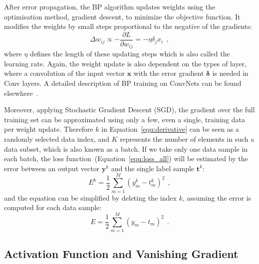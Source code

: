 After error propagation, the BP algorithm updates weights using the optimisation method, gradient descent, to minimize the objective function.
It modifies the weights by small steps proportional to the negative of the gradients:
\begin{equation}
\Delta w_{ij} \propto -\frac{\partial L}{\partial w_{ij}} = -\eta \delta_j x_i~~,
\label{equ:delta_w}
\end{equation}
where $\eta$ defines the length of these updating steps which is also called the learning rate.
Again, the weight update is also dependent on the types of layer, where a convolution of the input vector $\mathbf{x}$ with the error gradient  $\mathbf{\delta}$ is needed in Conv layers.
A detailed description of BP training on ConvNets can be found elsewhere~\citep{bouvrie2006notes}.

Moreover, applying Stochastic Gradient Descent (SGD), the gradient over the full training set can be approximated using only a few, even a single, training data per weight update.
Therefore $k$ in Equation~\ref{equ:derivative} can be seen as a randomly selected data index, and $K$ represents the number of elements in such a data subset, which is also known as a batch.
If we take only one data sample in each batch, the loss function~(Equation~\ref{equ:loss_all}) will be estimated by the error between an output vector $\mathbf{y}^k$ and the single label sample $\mathbf{t}^k$:
\begin{equation}
E^k = \frac{1}{2}\sum_{m=1}^M (y^{k}_{m}-t^{k}_{m})^{2}~~,
\label{equ:error_conv}
\end{equation}
and the equation can be simplified by deleting the index $k$, assuming the error is computed for each data sample:
\begin{equation}
E = \frac{1}{2}\sum_{m=1}^M (y_{m}-t_{m})^{2}~~.
\label{equ:error_non}
\end{equation}


\subsection{Activation Function and Vanishing Gradient}


